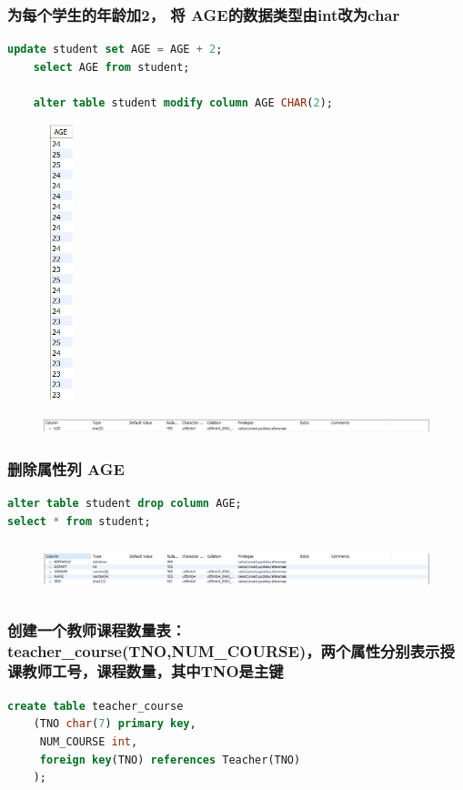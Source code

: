 \documentclass{ctexart}
\begin{document}
\subsubsection{为每个学生的年龄加2， 将 AGE的数据类型由int改为char}
\begin{lstlisting}[language=sql]
	update student set AGE = AGE + 2;  
	select AGE from student;  
	  
	alter table student modify column AGE CHAR(2);
\end{lstlisting}
\begin{figure}[H]
	\centering 
	\includegraphics[height=8cm,width=1cm]{8.png}
	\end{figure}
	\begin{figure}[H]
		\centering 
		\includegraphics[height=0.5cm,width=14cm]{9.png}
		\end{figure}
\subsubsection{删除属性列 AGE}
\begin{lstlisting}[language=sql]
alter table student drop column AGE;  
select * from student;
\end{lstlisting}
\begin{figure}[H]
	\centering 
	\includegraphics[height=1.5cm,width=16cm]{10.png}
	\end{figure}
\subsubsection{创建一个教师课程数量表：teacher\_course(TNO,NUM\_COURSE)，两个属性分别表示授课教师工号，课程数量，其中TNO是主键}
\begin{lstlisting}[language=sql]
	create table teacher_course  
	(TNO char(7) primary key,  
     NUM_COURSE int,  
     foreign key(TNO) references Teacher(TNO)  
    );  
\end{lstlisting}
\end{document}
